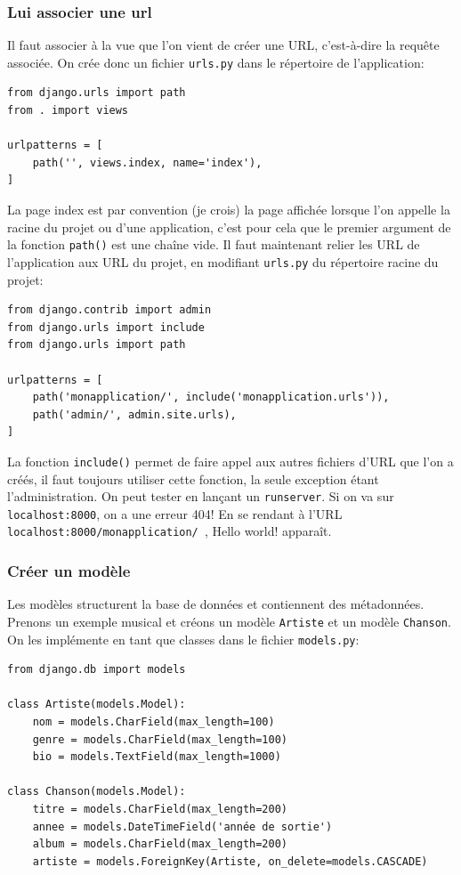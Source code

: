 \documentclass[a4paper, 10pt]{article}
\begin{document}
\subsubsection{Lui associer une url}
Il faut associer à la vue que l'on vient de créer une URL, c'est-à-dire la requête associée. On crée donc un fichier \texttt{urls.py} dans le répertoire de l'application:
\begin{verbatim}
from django.urls import path
from . import views

urlpatterns = [
    path('', views.index, name='index'),
]
\end{verbatim}

La page \og index \fg{} est par convention (je crois) la page affichée lorsque l'on appelle la racine du projet ou d'une application, c'est pour cela que le premier argument de la fonction \texttt{path()} est une chaîne vide. Il faut maintenant relier les URL de l'application aux URL du projet, en modifiant \texttt{urls.py} du répertoire racine du projet:

\begin{verbatim}
from django.contrib import admin
from django.urls import include
from django.urls import path

urlpatterns = [
    path('monapplication/', include('monapplication.urls')),
    path('admin/', admin.site.urls),
]
\end{verbatim}

La fonction \texttt{include()} permet de faire appel aux autres fichiers d’URL que l'on a créés, il faut toujours utiliser cette fonction, la seule exception étant l'administration. On peut tester en lançant un \texttt{runserver}. Si on va sur \texttt{localhost:8000}, on a une erreur 404! En se rendant à l'URL \texttt{localhost:8000/monapplication/ }, Hello world! apparaît.

\subsubsection{Créer un modèle}
Les modèles structurent la base de données et contiennent des métadonnées. Prenons un exemple musical et créons un modèle \texttt{Artiste} et un modèle \texttt{Chanson}. On les implémente en tant que classes dans le fichier \texttt{models.py}:
\begin{verbatim}
from django.db import models

class Artiste(models.Model):
    nom = models.CharField(max_length=100)
    genre = models.CharField(max_length=100)
    bio = models.TextField(max_length=1000)

class Chanson(models.Model):
    titre = models.CharField(max_length=200)
    annee = models.DateTimeField('année de sortie')
    album = models.CharField(max_length=200)
    artiste = models.ForeignKey(Artiste, on_delete=models.CASCADE)
\end{verbatim}
\end{document}
